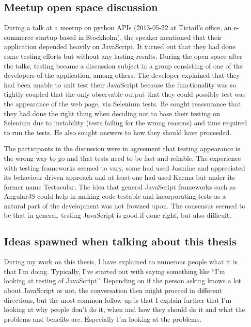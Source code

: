 \documentclass[11pt]{article}
\begin{document}
\subsection{Meetup open space discussion}
\label{sec:openspace}

During a talk at a meetup on python APIs (2013-05-22 at Tictail's office, an e-commerce startup based in Stockholm), the speaker mentioned that their application depended heavily on JavaScript. It turned out that they had done some testing efforts but without any lasting results. During the open space after the talks, testing became a discussion subject in a group consisting of one of the developers of the application, among others. The developer explained that they had been unable to unit test their JavaScript because the functionality was so tightly coupled that the only observable output that they could possibly test was the appearance of the web page, via Selenium tests. He sought reassurance that they had done the right thing when deciding not to base their testing on Selenium due to instability (tests failing for the wrong reasons) and time required to run the tests. He also sought answers to how they should have proceeded.

The participants in the discussion were in agreement that testing appearance is the wrong way to go and that tests need to be fast and reliable. The experience with testing frameworks seemed to vary, some had used Jasmine and appreciated its behaviour driven approach and at least one had used Karma but under its former name Testacular. The idea that general JavaScript frameworks such as AngularJS could help in making code testable and incorporating tests as a natural part of the development was not frowned upon. The consensus seemed to be that in general, testing JavaScript is good if done right, but also difficult.

\subsection{Ideas spawned when talking about this thesis}

During my work on this thesis, I have explained to numerous people what it is that I'm doing. Typically, I've started out with saying something like ``I'm looking at testing of JavaScript''. Depending on if the person asking knows a lot about JavaScript or not, the conversation then might proceed in different directions, but the most common follow up is that I explain further that I'm looking at why people don't do it, when and how they should do it and what the problems and benefits are. Especially I'm looking at the problems.
\end{document}
